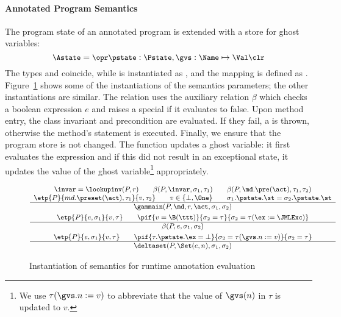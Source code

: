 \paragraph{Annotated Program Semantics}

The program state of an annotated program is extended with a store for
ghost variables:
\[{\small
\Astate = \opr \pstate : \Pstate, \gvs : \Name \mapsto \Val \clr}
\]
The types \FullProgram and \Program coincide, while \FullState is
instantiated as \Astate, and the mapping \progstate is defined as
\pstate. Figure~\ref{FigAnnotatedSem} shows some of the
instantiations of the semantics parameters; %
the other instantiations are similar. The relation \gammain uses
the auxiliary relation \(\beta\) which checks a boolean expression \(e\) and
raises a special \JMLExc if it evaluates to false. Upon method
entry, the class invariant and precondition are evaluated. If they
fail, a \JMLExc is thrown, otherwise the method's \preset statement is
executed. Finally, we ensure that the program store is not changed.
The function \deltaset updates a ghost variable: it first evaluates the
expression and if this did not result in an exceptional state, it updates the
value of the ghost variable\footnote{We use \(\tau(\gvs.n := v)\) to
abbreviate that the value of \(\gvs(n)\) in \(\tau\) is updated to
\(v\).} appropriately.

\begin{figure}[t]
\[{\small
\begin{array}[t]{c}
\invar = \lookupinv(P, r) \qquad
\beta(P, \invar, \sigma_1, \tau_1) \qquad
\beta(P, \md.\pre(\act), \tau_1, \tau_2) \\
\etp{P}{md.\preset(\act), \tau_1}{v,\tau_2} \qquad v\in\{\bot,\One\} \qquad
\sigma_1.\pstate.\st = \sigma_2.\pstate.\st\\
\hline
\gammain(P, \md, r, \act, \sigma_1, \sigma_2)
\smallskip\\


\etp{P}{e, \sigma_1}{v, \tau} \qquad
\pif{v = \B(\ttt)}{\sigma_2 = \tau}{\sigma_2 = \tau (\ex := \JMLExc)}\\
\hline
\beta(P, e, \sigma_1, \sigma_2)

\smallskip\\

\etp{P}{e, \sigma_1}{v, \tau} \qquad
\pif{\tau.\pstate.\ex = \bot}{\sigma_2 = \tau (\gvs.n := v)}{\sigma_2 = \tau}\\
\hline
\deltaset(P, \Set(e, n), \sigma_1, \sigma_2)
\end{array}}
\]
\caption{Instantiation of semantics for runtime annotation evaluation}
\label{FigAnnotatedSem}
\end{figure}


